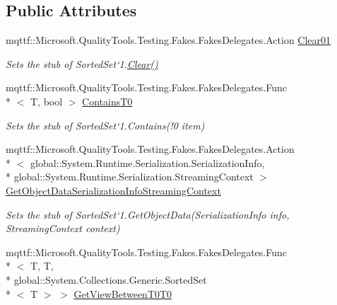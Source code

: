\subsection*{Public Attributes}
\begin{DoxyCompactItemize}
\item 
mqttf\-::\-Microsoft.\-Quality\-Tools.\-Testing.\-Fakes.\-Fakes\-Delegates.\-Action \hyperlink{class_system_1_1_collections_1_1_generic_1_1_fakes_1_1_stub_sorted_set_3_01_t_01_4_a05fdd5aa6c052abef1e3610b7ae20a19}{Clear01}
\begin{DoxyCompactList}\small\item\em Sets the stub of Sorted\-Set`1.\hyperlink{class_system_1_1_collections_1_1_generic_1_1_fakes_1_1_stub_sorted_set_3_01_t_01_4_a649b5664cbd33758bb866d58ad2696a9}{Clear()}\end{DoxyCompactList}\item 
mqttf\-::\-Microsoft.\-Quality\-Tools.\-Testing.\-Fakes.\-Fakes\-Delegates.\-Func\\*
$<$ T, bool $>$ \hyperlink{class_system_1_1_collections_1_1_generic_1_1_fakes_1_1_stub_sorted_set_3_01_t_01_4_aee11b545275b68e5953910c9fd62d029}{Contains\-T0}
\begin{DoxyCompactList}\small\item\em Sets the stub of Sorted\-Set`1.Contains(!0 item)\end{DoxyCompactList}\item 
mqttf\-::\-Microsoft.\-Quality\-Tools.\-Testing.\-Fakes.\-Fakes\-Delegates.\-Action\\*
$<$ global\-::\-System.\-Runtime.\-Serialization.\-Serialization\-Info, \\*
global\-::\-System.\-Runtime.\-Serialization.\-Streaming\-Context $>$ \hyperlink{class_system_1_1_collections_1_1_generic_1_1_fakes_1_1_stub_sorted_set_3_01_t_01_4_a63efa2ec1c7f383c0e0a0193a5c66b05}{Get\-Object\-Data\-Serialization\-Info\-Streaming\-Context}
\begin{DoxyCompactList}\small\item\em Sets the stub of Sorted\-Set`1.Get\-Object\-Data(\-Serialization\-Info info, Streaming\-Context context)\end{DoxyCompactList}\item 
mqttf\-::\-Microsoft.\-Quality\-Tools.\-Testing.\-Fakes.\-Fakes\-Delegates.\-Func\\*
$<$ T, T, \\*
global\-::\-System.\-Collections.\-Generic.\-Sorted\-Set\\*
$<$ T $>$ $>$ \hyperlink{class_system_1_1_collections_1_1_generic_1_1_fakes_1_1_stub_sorted_set_3_01_t_01_4_a5def2947c56fc18b976599cea3eed8ac}{Get\-View\-Between\-T0\-T0}

\end{DoxyCompactItemize}
